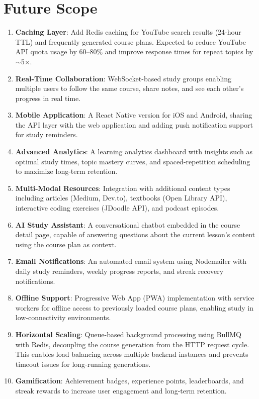 \documentclass[12pt,a4paper]{report}
\begin{document}
\section{Future Scope}
\begin{enumerate}
    \item \textbf{Caching Layer}: Add Redis caching for YouTube search results (24-hour TTL) and frequently generated course plans. Expected to reduce YouTube API quota usage by 60--80\% and improve response times for repeat topics by $\sim$5$\times$.
    \item \textbf{Real-Time Collaboration}: WebSocket-based study groups enabling multiple users to follow the same course, share notes, and see each other's progress in real time.
    \item \textbf{Mobile Application}: A React Native version for iOS and Android, sharing the API layer with the web application and adding push notification support for study reminders.
    \item \textbf{Advanced Analytics}: A learning analytics dashboard with insights such as optimal study times, topic mastery curves, and spaced-repetition scheduling to maximize long-term retention.
    \item \textbf{Multi-Modal Resources}: Integration with additional content types including articles (Medium, Dev.to), textbooks (Open Library API), interactive coding exercises (JDoodle API), and podcast episodes.
    \item \textbf{AI Study Assistant}: A conversational chatbot embedded in the course detail page, capable of answering questions about the current lesson's content using the course plan as context.
    \item \textbf{Email Notifications}: An automated email system using Nodemailer with daily study reminders, weekly progress reports, and streak recovery notifications.
    \item \textbf{Offline Support}: Progressive Web App (PWA) implementation with service workers for offline access to previously loaded course plans, enabling study in low-connectivity environments.
    \item \textbf{Horizontal Scaling}: Queue-based background processing using BullMQ with Redis, decoupling the course generation from the HTTP request cycle. This enables load balancing across multiple backend instances and prevents timeout issues for long-running generations.
    \item \textbf{Gamification}: Achievement badges, experience points, leaderboards, and streak rewards to increase user engagement and long-term retention.
\end{enumerate}
\end{document}

